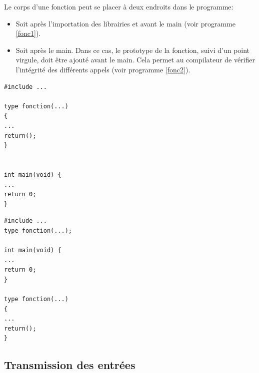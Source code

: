 \documentclass[a4paper,11pt]{book}
\theoremstyle{definition}
\begin{document}
Le corps d'une fonction peut se placer à deux endroits dans le programme:
\begin{itemize}
\item Soit après l'importation des librairies et avant le main (voir programme \ref{fonc1}). \item
Soit après le main. Dans ce cas, le prototype de la fonction, suivi d'un point virgule, doit
être ajouté avant le main. Cela permet au compilateur de vérifier l'intégrité des différents appels (voir programme \ref{fonc2}).\\
\end{itemize}
\begin{minipage}[b]{0.45\linewidth}
\begin{lstlisting}[caption=Fonction placée entre les librairies et le main,label=fonc1]
#include ...

type fonction(...)
{
...
return();
}


int main(void) {
...
return 0;
}
\end{lstlisting}
\end{minipage}\hfill
\begin{minipage}[b]{0.45\linewidth}
\begin{lstlisting}[caption=Fonction placée après le main,label=fonc2]
#include ...
type fonction(...);

int main(void) {
...
return 0;
}

type fonction(...)
{
...
return();
}
\end{lstlisting}
\end{minipage}

\subsection{Transmission des entrées} 
\end{document}
